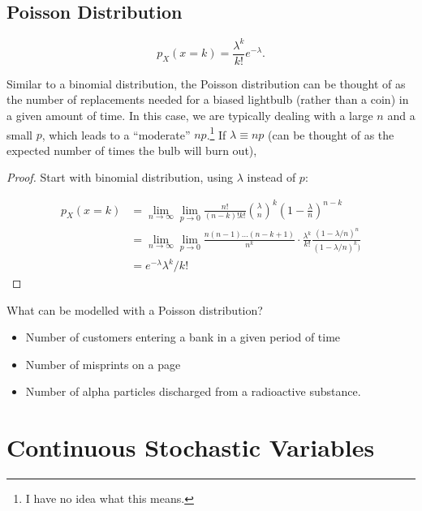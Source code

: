 \documentclass[13pt,oneside]{tufte-book}
\providecommand{\tightlist}{%
  \setlength{\itemsep}{0pt}\setlength{\parskip}{0pt}}
\theoremstyle{definition}
\theoremstyle{definition}
\theoremstyle{definition}
\theoremstyle{remark}
\let\BeginKnitrBlock\begin \let\EndKnitrBlock\end
\begin{document}
\section{Poisson Distribution}\label{poisson-distribution}

\BeginKnitrBlock{definition}[Poisson Distribution]
\protect\hypertarget{def:unnamed-chunk-51}{}{\label{def:unnamed-chunk-51}
{} } \[
p_X(x = k) = \frac{\lambda^k}{k!}e^{-\lambda}.
\]
\EndKnitrBlock{definition}

Similar to a binomial distribution, the Poisson distribution can be
thought of as the number of replacements needed for a biased lightbulb
(rather than a coin) in a given amount of time. In this case, we are
typically dealing with a large \(n\) and a small \(p\), which leads to a
``moderate'' \(np\).\footnote{I have no idea what this means.} If
\(\lambda \equiv np\) (can be thought of as the expected number of times
the bulb will burn out),

\BeginKnitrBlock{proof}
{} Start with binomial distribution, using
\(\lambda\) instead of \(p\):

\begin{align*}
p_X(x=k) &= \lim_{n\to\infty}\lim_{p\to 0} \frac{n!}{(n-k)!k!}\binom{\lambda}{n}^k\left(1-\frac{\lambda}{n}\right)^{n-k} \\
&= \lim_{n\to\infty}\lim_{p\to 0} \frac{n(n-1)\dots (n-k+1)}{n^k}\cdot\frac{\lambda^k}{k!}\frac{(1-\lambda/n)^n}{(1-\lambda/n)^k)} \\
&= e^{-\lambda}\lambda^k/k!
\end{align*}
\EndKnitrBlock{proof}

\begin{marginfigure}
What can be modelled with a Poisson distribution?

\begin{itemize}
\tightlist
\item
  Number of customers entering a bank in a given period of time
\item
  Number of misprints on a page
\item
  Number of alpha particles discharged from a radioactive substance.
\end{itemize}
\end{marginfigure}

\hypertarget{continuous-stochastic-variables}{\chapter{Continuous
Stochastic Variables}\label{continuous-stochastic-variables}}
\end{document}
